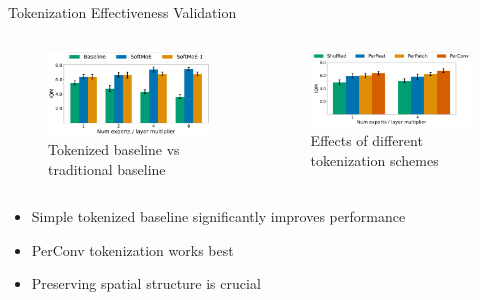 \documentclass{beamer}
\begin{document}
\begin{frame}{Tokenization Effectiveness Validation}
  \begin{columns}[T]
    \begin{column}{0.5\textwidth}
      \begin{figure}
        \centering
        \includegraphics[width=\textwidth]{Don_t_flatten_tokenize/figures/results/aggregate_comparison_just_iqm_bar.pdf}
        \caption{Tokenized baseline vs traditional baseline}
      \end{figure}
    \end{column}
    \begin{column}{0.5\textwidth}
      \begin{figure}
        \centering
        \includegraphics[width=\textwidth]{Don_t_flatten_tokenize/figures/results/tokentypes__just_iqm_bar.pdf}
        \caption{Effects of different tokenization schemes}
      \end{figure}
    \end{column}
  \end{columns}
  
  \begin{itemize}
    \item Simple tokenized baseline significantly improves performance
    \item PerConv tokenization works best
    \item Preserving spatial structure is crucial
  \end{itemize}
\end{frame}
\end{document}
